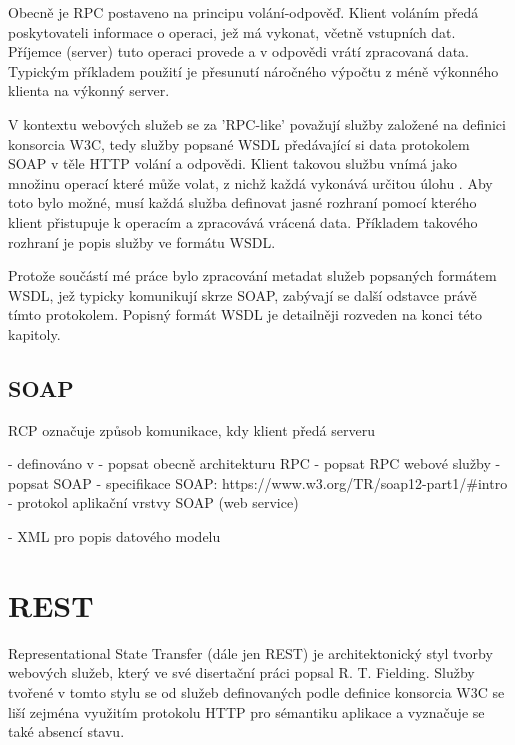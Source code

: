 \documentclass[czech,DP]{thesiskiv}
\begin{document}
Obecně je RPC postaveno na principu volání-odpověď. Klient voláním předá poskytovateli informace o operaci, jež má vykonat, včetně vstupních dat. Příjemce (server) tuto operaci provede a v odpovědi vrátí zpracovaná data. Typickým příkladem použití je přesunutí náročného výpočtu z méně výkonného klienta na výkonný server.

V kontextu webových služeb se za 'RPC-like' považují služby založené na definici konsorcia W3C, tedy služby popsané WSDL předávající si data protokolem SOAP v těle HTTP volání a odpovědi. Klient takovou službu vnímá jako množinu operací které může volat, z nichž každá vykonává určitou úlohu \cite{rpcVsRest}. Aby toto bylo možné, musí každá služba definovat jasné rozhraní pomocí kterého klient přistupuje k operacím a zpracovává vrácená data. Příkladem takového rozhraní je popis služby ve formátu WSDL. 

Protože součástí mé práce bylo zpracování metadat služeb popsaných formátem WSDL, jež typicky komunikují skrze SOAP, zabývají se další odstavce právě tímto protokolem. Popisný formát WSDL je detailněji rozveden na konci této kapitoly.

\subsection{SOAP} 



RCP označuje způsob komunikace, kdy klient předá serveru 

 - definováno v \cite{rpcThesis}
 - popsat obecně architekturu RPC
 - popsat RPC webové služby
 - popsat SOAP
 - specifikace SOAP: https://www.w3.org/TR/soap12-part1/\#intro
 - protokol aplikační vrstvy SOAP (web service)
 
 - XML pro popis datového modelu


\section{REST}
\label{sec:rest}

%

Representational State Transfer (dále jen REST) je architektonický styl tvorby webových služeb, který ve své disertační práci \cite{fielding2000rest} popsal R. T. Fielding. Služby tvořené v tomto stylu se od služeb definovaných podle definice konsorcia W3C se liší zejména využitím protokolu HTTP pro sémantiku aplikace a vyznačuje se také absencí stavu. 
\end{document}
